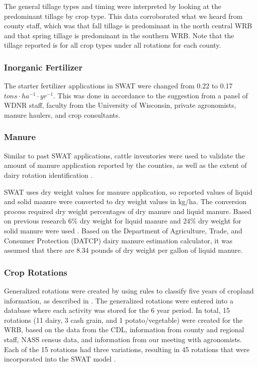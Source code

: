 The general tillage types and timing were interpreted by looking at the predominant tillage by
crop type. This data corroborated what we heard from county staff, which was that
fall tillage is predominant in the north central WRB and that spring tillage is predominant in the
southern WRB. Note that the tillage reported is for all crop types under all rotations for each county.

\subsubsection{Inorganic Fertilizer}

The starter fertilizer applications in SWAT were changed from 0.22 to 0.17 $tons \cdot ha^{-1} \cdot yr^{-1}$. This was done in accordance to the suggestion from a panel of WDNR staff, faculty from the University of Wisconsin, private agronomists, manure haulers, and crop consultants.

\subsubsection{Manure}

Similar to past SWAT applications, cattle inventories were used to validate the amount of manure application reported by the counties, as well as the extent of dairy rotation identification \citep{baumgart_source_2005, freihoefer_mead_2007, timm_swat_2011}.

SWAT uses dry weight values for manure application, so reported values of liquid and solid manure were converted to dry weight values in kg/ha. The conversion process required dry weight percentages of dry manure and liquid manure. Based on previous research 6\% dry weight for liquid manure and 24\% dry weight for solid manure were used \citep{jokela_dairyman_2009, laboski_a2809_2012, nrcs_590_2006}. Based on the Department of Agriculture, Trade, and Consumer Protection (DATCP) dairy manure estimation calculator, it was assumed that there are 8.34 pounds of dry weight per gallon of liquid manure.

\subsubsection{Crop Rotations}

Generalized rotations were created by using rules to classify five years of cropland information, as described in .  
The generalized rotations were entered into a database where each activity was stored for the 6 year
period. In total, 15 rotations (11 dairy, 3 cash grain, and 1 potato/vegetable) were created for the WRB,
based on the data from the CDL, information from county and regional staff, NASS census data, and
information from our meeting with agronomists. Each of the 15 rotations had three
variations, resulting in 45 rotations that were incorporated into the SWAT model .


